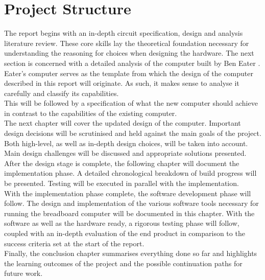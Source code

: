\documentclass[11pt]{informatics-report}
\begin{document}
\section{Project Structure}
The report begins with an in-depth circuit specification, design and analysis literature review. These core skills lay the theoretical foundation necessary for understanding the reasoning for choices when designing the hardware.
The next section is concerned with a detailed analysis of the computer built by Ben Eater \cite{eater2019breadboard}. Eater's computer serves as the template from which the design of the computer described in this report will originate. As such, it makes sense to analyse it carefully and classify its capabilities. \\
This will be followed by a specification of what the new computer should achieve in contrast to the capabilities of the existing computer. \\
The next chapter will cover the updated design of the computer. Important design decisions will be scrutinised and held against the main goals of the project. Both high-level, as well as in-depth design choices, will be taken into account. Main design challenges will be discussed and appropriate solutions presented. \\
After the design stage is complete, the following chapter will document the implementation phase. A detailed chronological breakdown of build progress will be presented. Testing will be executed in parallel with the implementation. \\
With the implementation phase complete, the software development phase will follow. The design and implementation of the various software tools necessary for running the breadboard computer will be documented in this chapter.
With the software as well as the hardware ready, a rigorous testing phase will follow, coupled with an in-depth evaluation of the end product in comparison to the success criteria set at the start of the report. \\
Finally, the conclusion chapter summarises everything done so far and highlights the learning outcomes of the project and the possible continuation paths for future work. \\















% 
% 
% 
\end{document}
